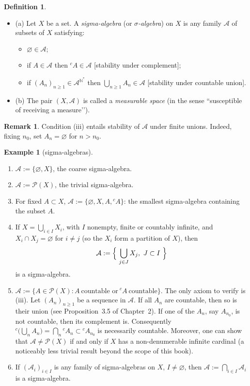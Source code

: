 \documentclass[11pt]{article}
\theoremstyle{definition}
\newtheorem{definition}{Definition}[section]
\newtheorem{example}{Example}[section]
\newtheorem{remark}{Remark}[section]
\begin{document}
\begin{definition}
\begin{itemize}
\item (a) Let $X$ be a set. A \emph{sigma-algebra} (or \emph{$\sigma$-algebra}) on $X$ is any family $\mathcal A$ of subsets of $X$ satisfying:
\begin{itemize}[leftmargin=1.5em]
\item[(i)] $\varnothing\in\mathcal A$;
\item[(ii)] if $A\in\mathcal A$ then ${}^{c}\!A\in\mathcal A$ \hfill[stability under complement];
\item[(iii)] if $(A_n)_{n\ge1}\in\mathcal A^{\mathbb N^{\!*}}$ then $\displaystyle \bigcup_{n\ge1} A_n\in\mathcal A$ \hfill[stability under countable union].
\end{itemize}
\item (b) The pair $(X,\mathcal A)$ is called a \emph{measurable space} (in the sense “susceptible of receiving a measure’’).
\end{itemize}
\end{definition}

\begin{remark} 
Condition (iii) entails stability of $\mathcal A$ under finite unions. Indeed, fixing $n_0$, set $A_n=\varnothing$ for $n>n_0$.
\end{remark}

\begin{example}[sigma-algebras]

\begin{enumerate}[leftmargin=1.5em,label=\arabic*.]
\item $\mathcal A:=\{\varnothing,X\}$, the coarse sigma-algebra.
\item $\mathcal A:=\mathcal P(X)$, the trivial sigma-algebra.
\item For fixed $A\subset X$, $\mathcal A:=\{\varnothing,X,A,{}^{c}\!A\}$: the smallest sigma-algebra containing the subset $A$.
\item If $X=\bigcup_{i\in I} X_i$, with $I$ nonempty, finite or countably infinite, and $X_i\cap X_j=\varnothing$ for $i\ne j$ (so the $X_i$ form a partition of $X$), then
\[
\mathcal A:=\Bigl\{\ \bigcup_{j\in J} X_j,\ J\subset I\ \Bigr\}
\]
is a sigma-algebra.
\item $\mathcal A:=\{A\in\mathcal P(X): A\ \text{countable or}\ {}^{c}\!A\ \text{countable}\}$.
The only axiom to verify is (iii). Let $(A_n)_{n\ge1}$ be a sequence in $\mathcal A$.
If all $A_n$ are countable, then so is their union (see Proposition~3.5 of Chapter~2).
If one of the $A_n$, say $A_{n_0}$, is not countable, then its complement is.
Consequently ${}^{c}\!\bigl(\bigcup_n A_n\bigr)=\bigcap_n {}^{c}\!A_n\subset {}^{c}\!A_{n_0}$ is necessarily countable.
Moreover, one can show that $\mathcal A\ne\mathcal P(X)$ if and only if $X$ has a non-denumerable infinite cardinal (a noticeably less trivial result beyond the scope of this book).
\item If $(\mathcal A_i)_{i\in I}$ is any family of sigma-algebras on $X$, $I\ne\varnothing$, then $\displaystyle \mathcal A:=\bigcap_{i\in I}\mathcal A_i$ is a sigma-algebra.
\end{enumerate}
\end{example}
\end{document}
